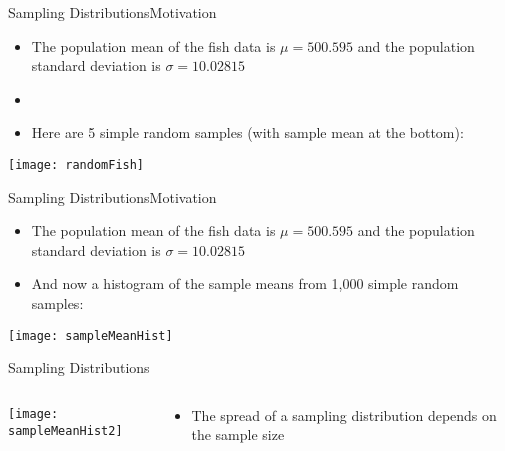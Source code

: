 \documentclass[xcolor=dvipsnames]{beamer}
\begin{document}
\begin{frame}{Sampling Distributions}{Motivation}
	\begin{itemize}
		\item The population mean of the fish data is $\mu = 500.595$ and the population standard deviation is $\sigma = 10.02815$ \pause 
		\item[]
		\item Here are 5 simple random samples (with sample mean at the bottom): \pause 
	\end{itemize}
	\begin{center}
		\texttt{[image: randomFish]}
	\end{center}
\end{frame}

\begin{frame}{Sampling Distributions}{Motivation}
	\begin{itemize}
		\item The population mean of the fish data is $\mu = 500.595$ and the population standard deviation is $\sigma = 10.02815$ \pause 
		\item And now a histogram of the sample means from 1,000 simple random samples:
	\end{itemize}
	\begin{center}
		\texttt{[image: sampleMeanHist]}
	\end{center}
\end{frame}

\begin{frame}{Sampling Distributions}
	\begin{columns}
		\begin{column}{.7 \textwidth}
			\begin{center}
				\texttt{[image: sampleMeanHist2]}
			\end{center}
		\end{column}
		\begin{column}{.3 \textwidth}
			\begin{itemize}
				\item The spread of a sampling distribution depends on the sample size
			\end{itemize}
		\end{column}
	\end{columns}
\end{frame}
\end{document}
